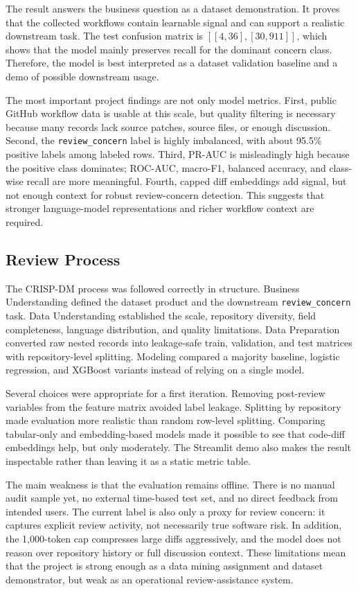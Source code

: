 The result answers the business question as a dataset demonstration. It proves that the collected workflows contain learnable signal and can support a realistic downstream task. The test confusion matrix is \([[4,36],[30,911]]\), which shows that the model mainly preserves recall for the dominant concern class. Therefore, the model is best interpreted as a dataset validation baseline and a demo of possible downstream usage.

The most important project findings are not only model metrics. First, public GitHub workflow data is usable at this scale, but quality filtering is necessary because many records lack source patches, source files, or enough discussion. Second, the \texttt{review\_concern} label is highly imbalanced, with about 95.5\% positive labels among labeled rows. Third, PR-AUC is misleadingly high because the positive class dominates; ROC-AUC, macro-F1, balanced accuracy, and class-wise recall are more meaningful. Fourth, capped diff embeddings add signal, but not enough context for robust review-concern detection. This suggests that stronger language-model representations and richer workflow context are required.

\subsection{Review Process}

The CRISP-DM process was followed correctly in structure. Business Understanding defined the dataset product and the downstream \texttt{review\_concern} task. Data Understanding established the scale, repository diversity, field completeness, language distribution, and quality limitations. Data Preparation converted raw nested records into leakage-safe train, validation, and test matrices with repository-level splitting. Modeling compared a majority baseline, logistic regression, and XGBoost variants instead of relying on a single model.

Several choices were appropriate for a first iteration. Removing post-review variables from the feature matrix avoided label leakage. Splitting by repository made evaluation more realistic than random row-level splitting. Comparing tabular-only and embedding-based models made it possible to see that code-diff embeddings help, but only moderately. The Streamlit demo also makes the result inspectable rather than leaving it as a static metric table.

The main weakness is that the evaluation remains offline. There is no manual audit sample yet, no external time-based test set, and no direct feedback from intended users. The current label is also only a proxy for review concern: it captures explicit review activity, not necessarily true software risk. In addition, the 1,000-token cap compresses large diffs aggressively, and the model does not reason over repository history or full discussion context. These limitations mean that the project is strong enough as a data mining assignment and dataset demonstrator, but weak as an operational review-assistance system.

